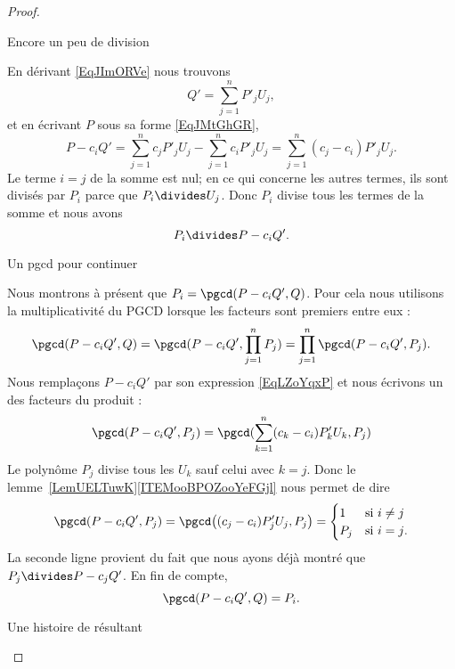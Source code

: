 \begin{proof}
\begin{subproof}
		\item[Encore un peu de division]

		En dérivant \eqref{EqJImORVe} nous trouvons
		\begin{equation}
			Q'=\sum_{j=1}^nP'_jU_j,
		\end{equation}
		et en écrivant \( P\) sous sa forme \eqref{EqJMtGhGR},
		\begin{equation}    \label{EqLZoYqxP}
			P-c_iQ'=\sum_{j=1}^nc_jP'_jU_j-\sum_{j=1}^nc_iP'_jU_j=\sum_{j=1}^n(c_j-c_i)P'_jU_j.
		\end{equation}
		Le terme \( i=j\) de la somme est nul; en ce qui concerne les autres termes, ils sont divisés par \( P_i\) parce que \( P_i\divides U_j\). Donc \( P_i\) divise tous les termes de la somme et nous avons
		\begin{equation}
			P_i\divides P-c_iQ'.
		\end{equation}

		\item[Un pgcd pour continuer]

		Nous montrons à présent que \( P_i=\pgcd(P-c_iQ',Q)\). Pour cela nous utilisons la multiplicativité du PGCD lorsque les facteurs sont premiers entre eux :
		\begin{equation}
			\pgcd(P-c_iQ',Q)=\pgcd(P-c_iQ',\prod_{j=1}^nP_j)=\prod_{j=1}^n\pgcd(P-c_iQ',P_j).
		\end{equation}
		Nous remplaçons \( P-c_iQ'\) par son expression \eqref{EqLZoYqxP} et nous écrivons un des facteurs du produit :
		\begin{equation}
			\pgcd(P-c_iQ',P_j)=\pgcd(\sum_{k=1}^n(c_k-c_i)P'_kU_k,P_j)
		\end{equation}
		Le polynôme \( P_j\) divise tous les \( U_k\) sauf celui avec \( k=j\). Donc le lemme~\ref{LemUELTuwK}\ref{ITEMooBPOZooYeFGjl} nous permet de dire
		\begin{equation}
			\pgcd(P-c_iQ',P_j)=\pgcd\big( (c_j-c_i)P'_jU_j,P_j \big)=\begin{cases}
				1   & \text{si } i\neq j     \\
				P_j & \text{si } i=j\text{.}
			\end{cases}
		\end{equation}
		La seconde ligne provient du fait que nous ayons déjà montré que \( P_j\divides P-c_jQ'\). En fin de compte,
		\begin{equation}
			\pgcd(P-c_iQ',Q)=P_i.
		\end{equation}

		\item[Une histoire de résultant]


\end{subproof}
\end{proof}
